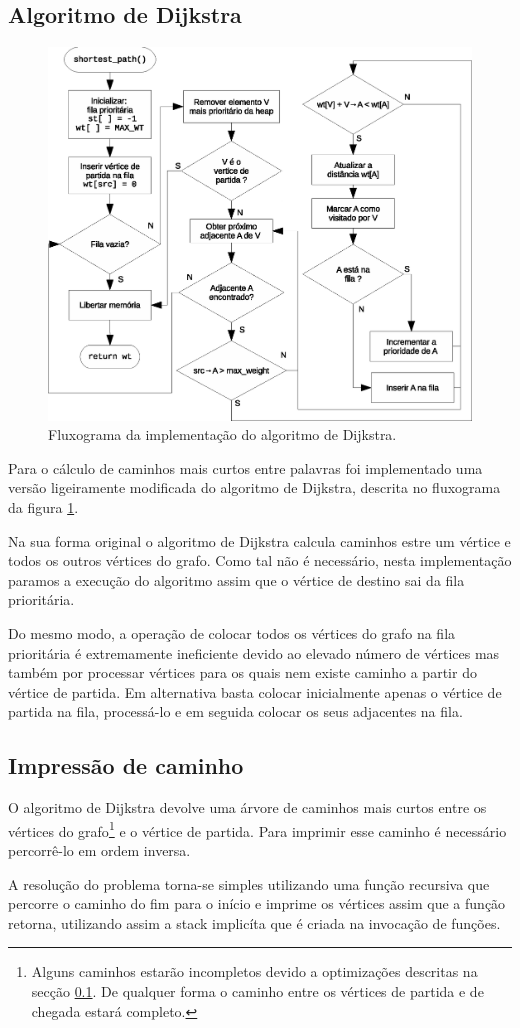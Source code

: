 \documentclass[portuguese, a4paper]{article}
\begin{document}
	\subsection{Algoritmo de Dijkstra}
	\label{sec:alg_dijkstra}
	\begin{figure}[H]
		\centering
		\includegraphics[width=0.85\linewidth]{dijkstra}
		\caption{Fluxograma da implementação do algoritmo de Dijkstra.}
		\label{fig:dijkstra}
	\end{figure}
	\par
	Para o cálculo de caminhos mais curtos entre palavras foi implementado uma
	versão ligeiramente modificada do algoritmo de Dijkstra, descrita no
	fluxograma da figura \ref{fig:dijkstra}.
	\par
	Na sua forma original o algoritmo de Dijkstra calcula caminhos estre um
	vértice e todos os outros vértices do grafo. Como tal não é necessário,
	nesta implementação paramos a execução do algoritmo assim que o vértice de
	destino sai da fila prioritária.
	\par
	Do mesmo modo, a operação de colocar todos os vértices do grafo na fila
	prioritária é extremamente ineficiente devido ao elevado número de
	vértices mas também por processar vértices para os quais nem existe caminho
	a partir do vértice de partida. Em alternativa basta colocar inicialmente
	apenas o vértice de partida na fila, processá-lo e em seguida colocar os
	seus adjacentes na fila.

	\subsection{Impressão de caminho}
	\par
	O algoritmo de Dijkstra devolve uma árvore de caminhos mais curtos entre os
	vértices do grafo\footnote{Alguns caminhos estarão incompletos devido a
	optimizações descritas na secção \ref{sec:alg_dijkstra}. De qualquer forma o
	caminho entre os vértices de partida e de chegada estará completo.} e o vértice
	de partida. Para imprimir esse caminho é necessário percorrê-lo em ordem
	inversa.
	\par
	A resolução do problema torna-se simples utilizando uma função
	recursiva que percorre o caminho do fim para o início e imprime os vértices
	assim que a função retorna, utilizando assim a stack implicíta que é criada
	na invocação de funções.
\end{document}
